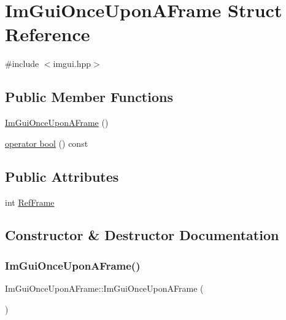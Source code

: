 \hypertarget{struct_im_gui_once_upon_a_frame}{}\section{Im\+Gui\+Once\+Upon\+A\+Frame Struct Reference}
\label{struct_im_gui_once_upon_a_frame}


{\ttfamily \#include $<$imgui.\+hpp$>$}

\subsection*{Public Member Functions}
\begin{DoxyCompactItemize}
\item 
\hyperlink{struct_im_gui_once_upon_a_frame_ac9513f72a884f6fe844869b157b23f1f}{Im\+Gui\+Once\+Upon\+A\+Frame} ()
\item 
\hyperlink{struct_im_gui_once_upon_a_frame_a3c912b79bc333ce746356001431c2504}{operator bool} () const
\end{DoxyCompactItemize}
\subsection*{Public Attributes}
\begin{DoxyCompactItemize}
\item 
int \hyperlink{struct_im_gui_once_upon_a_frame_a2d44776b8e7bdeec217f88be9f832e08}{Ref\+Frame}
\end{DoxyCompactItemize}


\subsection{Constructor \& Destructor Documentation}
\hypertarget{struct_im_gui_once_upon_a_frame_ac9513f72a884f6fe844869b157b23f1f}{}\label{struct_im_gui_once_upon_a_frame_ac9513f72a884f6fe844869b157b23f1f} 
\subsubsection{\texorpdfstring{Im\+Gui\+Once\+Upon\+A\+Frame()}{ImGuiOnceUponAFrame()}}
{\footnotesize\ttfamily Im\+Gui\+Once\+Upon\+A\+Frame\+::\+Im\+Gui\+Once\+Upon\+A\+Frame (\begin{DoxyParamCaption}{ }\end{DoxyParamCaption})}



